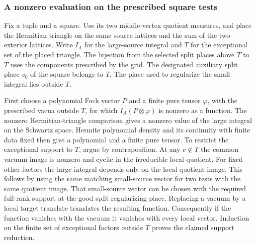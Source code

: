 \subsubsection{A nonzero evaluation on the prescribed square tests}
Fix a tuple and a square. Use its two middle-vertex
quotient measures, and place the Hermitian triangle on
the same source lattices and the sum of the two exterior
lattices. Write \(I_A\) for the large-source integral and
\(T\) for the exceptional set of the placed triangle.
The bijection from the selected split places above
\(T\) to \(T\) uses the components prescribed by the grid.
The designated auxiliary split place \(v_0\) of the square
belongs to \(T\). The place used to regularize the small
integral lies outside \(T\).

First choose a polynomial Fock vector \(P\) and a finite
pure tensor \(\varphi\), with the prescribed vacua
outside \(T\), for which \(I_A(P\otimes\varphi)\) is nonzero
as a function. The nonzero Hermitian-triangle comparison
gives a nonzero value of the large integral on the
Schwartz space. Hermite polynomial density and its continuity
with finite data fixed then give a polynomial and a finite
pure tensor. To restrict the exceptional support to \(T\),
argue by contraposition. At any \(v\notin T\) the common
vacuum image is nonzero and cyclic in the irreducible
local quotient. For fixed other factors the large integral
depends only on the local quotient image. This follows by
using the same matching small-source vector for two tests
with the same quotient image. That small-source vector can
be chosen with the required full-rank support at the good
split regularizing place. Replacing a vacuum by a local
target translate translates the resulting function.
Consequently if the function vanishes with the vacuum it
vanishes with every local vector. Induction on the finite
set of exceptional factors outside \(T\) proves the
claimed support reduction.

